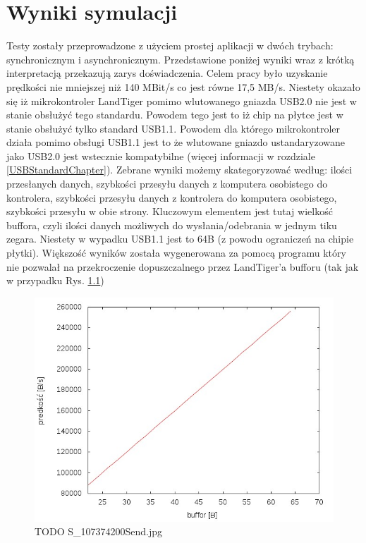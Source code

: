 \documentclass{BscUS}
\begin{document}
\chapter{Wyniki symulacji}
\label{resultsChapter}
Testy zostały przeprowadzone z użyciem prostej aplikacji w dwóch trybach: synchronicznym i asynchronicznym. Przedstawione poniżej wyniki wraz z krótką interpretacją przekazują zarys doświadczenia. Celem pracy było uzyskanie prędkości nie mniejszej niż 140 MBit/s co jest równe 17,5 MB/s.
\newline
\indent Niestety okazało się iż mikrokontroler LandTiger pomimo wlutowanego gniazda USB2.0 nie jest w stanie obsłużyć tego standardu. Powodem tego jest to iż chip na płytce jest w stanie obsłużyć tylko standard USB1.1.
\newline
\indent Powodem dla którego mikrokontroler działa pomimo obsługi USB1.1 jest to że wlutowane gniazdo ustandaryzowane jako USB2.0 jest wstecznie kompatybilne (więcej informacji w rozdziale \ref{USBStandardChapter}).
\newline
\indent Zebrane wyniki możemy skategoryzować według: ilości przesłanych danych, szybkości przesyłu danych z komputera osobistego do kontrolera, szybkości przesyłu danych z kontrolera do komputera osobistego, szybkości przesyłu w obie strony. Kluczowym elementem jest tutaj wielkość buffora, czyli ilości danych możliwych do wysłania/odebrania w jednym tiku zegara. Niestety w wypadku USB1.1 jest to 64B (z powodu ograniczeń na chipie płytki). Większość wyników została wygenerowana za pomocą programu który nie pozwalał na przekroczenie dopuszczalnego przez LandTiger'a bufforu (tak jak w przypadku Rys. \ref{fig:S_107374200Send})
\begin{figure}[h]
\centering
\includegraphics{./img/S_107374200Send}
\caption{TODO S\_107374200Send.jpg}
\label{fig:S_107374200Send}
\end{figure}
\end{document}
